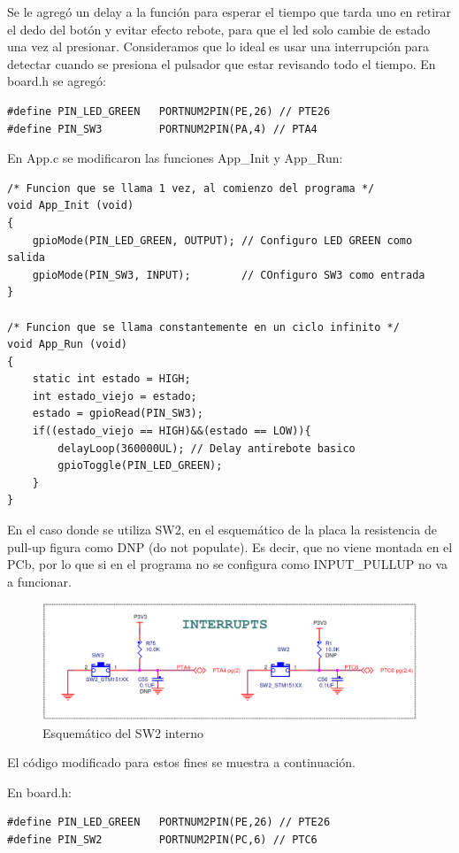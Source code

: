 \documentclass{article}
\begin{document}
Se le agregó un delay a la función para esperar el tiempo que tarda uno en retirar el dedo del botón y evitar efecto rebote, para que el led solo cambie de estado una vez al presionar. Consideramos que lo ideal es usar una interrupción para detectar cuando se presiona el pulsador que estar revisando todo el tiempo.
En board.h se agregó:

\begin{lstlisting}
#define PIN_LED_GREEN   PORTNUM2PIN(PE,26) // PTE26
#define PIN_SW3         PORTNUM2PIN(PA,4) // PTA4
\end{lstlisting}

En App.c se modificaron las funciones App\_Init y App\_Run:

\begin{lstlisting}
/* Funcion que se llama 1 vez, al comienzo del programa */
void App_Init (void)
{
    gpioMode(PIN_LED_GREEN, OUTPUT); // Configuro LED GREEN como salida
    gpioMode(PIN_SW3, INPUT);        // COnfiguro SW3 como entrada
}

/* Funcion que se llama constantemente en un ciclo infinito */
void App_Run (void)
{
	static int estado = HIGH;
	int estado_viejo = estado;
	estado = gpioRead(PIN_SW3);
	if((estado_viejo == HIGH)&&(estado == LOW)){
		delayLoop(360000UL); // Delay antirebote basico
		gpioToggle(PIN_LED_GREEN);
	}
}
\end{lstlisting}

En el caso donde se utiliza SW2, en el esquemático de la placa la resistencia de pull-up figura como DNP (do not populate). Es decir, que no viene montada en el PCb, por lo que si en el programa no se configura como INPUT\_PULLUP no va a funcionar.

\begin{figure}[ht]
	\centering
	\includegraphics[width=0.7 \textwidth]
	{../Imagenes/SW2_DNP.png}
	\caption{Esquemático del SW2 interno}
	\label{fig:ej1}
\end{figure}

El código modificado para estos fines se muestra a continuación.

En board.h:

\begin{lstlisting}
#define PIN_LED_GREEN   PORTNUM2PIN(PE,26) // PTE26
#define PIN_SW2         PORTNUM2PIN(PC,6) // PTC6
\end{lstlisting}
\end{document}
